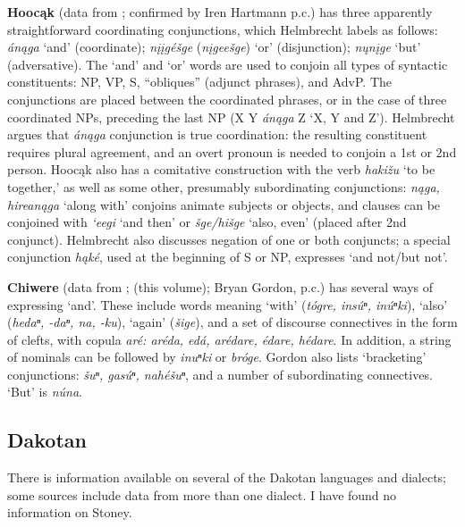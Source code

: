 \documentclass[output=paper]{LSP/langsci}
\begin{document}
\textbf{Hooc\k{a}k} (data from \citealt{Helmbrecht2004}; confirmed by Iren Hartmann p.c.) has three apparently straightforward coordinating conjunctions, which Helmbrecht labels as follows: \textit{\'an\k{a}ga} `and' (coordinate); \textit{n\k{i}\k{i}g\'e\v{s}ge} (\textit{n\k{i}gee\v{s}ge}) `or' (disjunction); \textit{n\k{u}n\k{i}ge} `but' (adversative). The `and' and `or' words are used to conjoin all types of syntactic constituents: NP, VP, S, ``obliques'' (adjunct phrases), and AdvP. The conjunctions are placed between the coordinated phrases, or in the case of three coordinated NPs, preceding the last NP (X Y \textit{\'an\k{a}ga} Z `X, Y and Z'). Helmbrecht argues that \textit{\'an\k{a}ga} conjunction is true coordination: the resulting constituent requires plural agreement, and an overt pronoun is needed to conjoin a 1st or 2nd person. Hooc\k{a}k also has a comitative construction with the verb \textit{haki\v{z}u} `to be together,' as well as some other, presumably subordinating conjunctions: \textit{n\k{a}ga, hirean\k{a}ga} `along with' conjoins animate subjects or objects, and clauses can be conjoined with \textit{`eegi} `and then' or \textit{\v{s}ge/hi\v{s}ge} `also, even' (placed after 2nd conjunct). Helmbrecht also discusses negation of one or both conjuncts; a special conjunction \textit{h\k{a}k\'e}, used at the beginning of S or NP, expresses `and not/but not'.

\textbf{Chiwere} (data from \citealt{Goodtracks1992}; \citealt{Greer2016} (this volume); Bryan Gordon, p.c.) has several ways of expressing `and'. These include words meaning `with' (\textit{t\'ogre, ins\'uⁿ, in\'uⁿki}), `also' (\textit{hedaⁿ, -daⁿ, na, -ku}), `again' (\textit{\v{s}ige}), and a set of discourse connectives in the form of clefts, with copula \textit{ar\'e: ar\'eda, ed\'a, ar\'edare, \'edare, h\'edare}. In addition, a string of nominals can be followed by \textit{inuⁿki} or \textit{br\'oge}. Gordon also lists `bracketing' conjunctions: \textit{\v{s}uⁿ, gas\'uⁿ, nah\'e\v{s}uⁿ}, and a number of subordinating connectives. `But' is \textit{n\'una}.

\subsection{Dakotan}
 
There is information available on several of the Dakotan languages and dialects; some sources include data from more than one dialect. I have found no information on Stoney.
\end{document}
